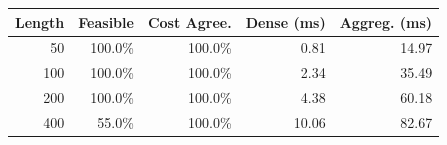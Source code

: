 \begin{tabular}{rrrrr}
\toprule
\textbf{Length} & \textbf{Feasible} & \textbf{Cost Agree.} & \textbf{Dense (ms)} & \textbf{Aggreg. (ms)} \\
\midrule
50 & 100.0\% & 100.0\% & 0.81 & 14.97 \\
100 & 100.0\% & 100.0\% & 2.34 & 35.49 \\
200 & 100.0\% & 100.0\% & 4.38 & 60.18 \\
400 & 55.0\% & 100.0\% & 10.06 & 82.67 \\
\bottomrule
\end{tabular}
